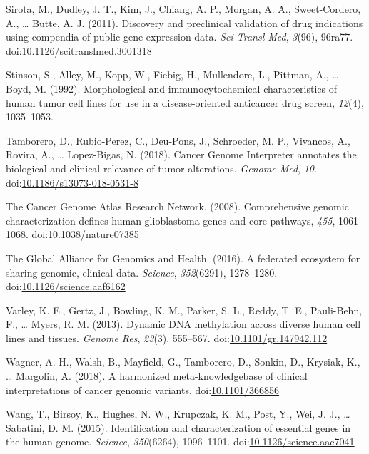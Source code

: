 \documentclass[man,floatsintext]{apa6}
\begin{document}
\hypertarget{ref-sirota2011}{}
Sirota, M., Dudley, J. T., Kim, J., Chiang, A. P., Morgan, A. A.,
Sweet-Cordero, A., \ldots{} Butte, A. J. (2011). Discovery and
preclinical validation of drug indications using compendia of public
gene expression data. \emph{Sci Transl Med}, \emph{3}(96), 96ra77.
doi:\href{https://doi.org/10.1126/scitranslmed.3001318}{10.1126/scitranslmed.3001318}

\hypertarget{ref-stinson1992}{}
Stinson, S., Alley, M., Kopp, W., Fiebig, H., Mullendore, L., Pittman,
A., \ldots{} Boyd, M. (1992). Morphological and immunocytochemical
characteristics of human tumor cell lines for use in a disease-oriented
anticancer drug screen, \emph{12}(4), 1035--1053.

\hypertarget{ref-tamborero2018}{}
Tamborero, D., Rubio-Perez, C., Deu-Pons, J., Schroeder, M. P.,
Vivancos, A., Rovira, A., \ldots{} Lopez-Bigas, N. (2018). Cancer Genome
Interpreter annotates the biological and clinical relevance of tumor
alterations. \emph{Genome Med}, \emph{10}.
doi:\href{https://doi.org/10.1186/s13073-018-0531-8}{10.1186/s13073-018-0531-8}

\hypertarget{ref-thecancergenomeatlasresearchnetwork2008}{}
The Cancer Genome Atlas Research Network. (2008). Comprehensive genomic
characterization defines human glioblastoma genes and core pathways,
\emph{455}, 1061--1068.
doi:\href{https://doi.org/10.1038/nature07385}{10.1038/nature07385}

\hypertarget{ref-theglobalallianceforgenomicsandhealth2016}{}
The Global Alliance for Genomics and Health. (2016). A federated
ecosystem for sharing genomic, clinical data. \emph{Science},
\emph{352}(6291), 1278--1280.
doi:\href{https://doi.org/10.1126/science.aaf6162}{10.1126/science.aaf6162}

\hypertarget{ref-varley2013}{}
Varley, K. E., Gertz, J., Bowling, K. M., Parker, S. L., Reddy, T. E.,
Pauli-Behn, F., \ldots{} Myers, R. M. (2013). Dynamic DNA methylation
across diverse human cell lines and tissues. \emph{Genome Res},
\emph{23}(3), 555--567.
doi:\href{https://doi.org/10.1101/gr.147942.112}{10.1101/gr.147942.112}

\hypertarget{ref-wagner2018}{}
Wagner, A. H., Walsh, B., Mayfield, G., Tamborero, D., Sonkin, D.,
Krysiak, K., \ldots{} Margolin, A. (2018). A harmonized
meta-knowledgebase of clinical interpretations of cancer genomic
variants. doi:\href{https://doi.org/10.1101/366856}{10.1101/366856}

\hypertarget{ref-wang2015a}{}
Wang, T., Birsoy, K., Hughes, N. W., Krupczak, K. M., Post, Y., Wei, J.
J., \ldots{} Sabatini, D. M. (2015). Identification and characterization
of essential genes in the human genome. \emph{Science},
\emph{350}(6264), 1096--1101.
doi:\href{https://doi.org/10.1126/science.aac7041}{10.1126/science.aac7041}
\end{document}
